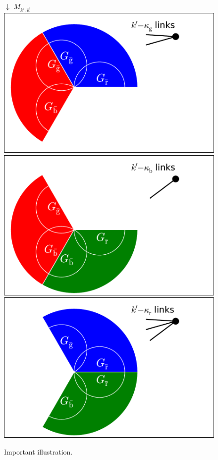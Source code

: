 \documentclass[aps, pre, onecolumn, a4paper, floatfix]{revtex4}
\begin{document}
\begin{figure}[htb]
\begin{minipage}[b]{0.35\linewidth}
\begin{center}
    {\huge $\downarrow$} $M_{k',\vec{\kappa}}$\\
    \includegraphics[width=0.99\columnwidth]{sets_k_no_2_gc.pdf}\\
    \includegraphics[trim=0 0 0 190,clip,width=0.99\columnwidth]{sets_k_no_3_gc.pdf}\\
    \includegraphics[trim=0 0 0 190,clip,width=0.99\columnwidth]{sets_k_no_1_gc.pdf}
   \end{center}
  \end{minipage}
    \caption{Important illustration.}
    \label{fig:1}
\end{figure}
%
\end{document}
